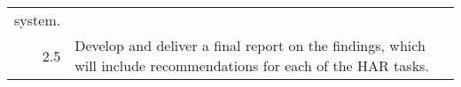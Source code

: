 \begin{tabular}{r L{4in}}
    system.                                                                                                                                                                                                                                                                                                                                                                            \\
    2.5  & Develop and deliver a final report on the findings, which will include recommendations for each of the HAR tasks.                                                                                                                                                                                                                                                           \\
    \bottomrule
\end{tabular}
